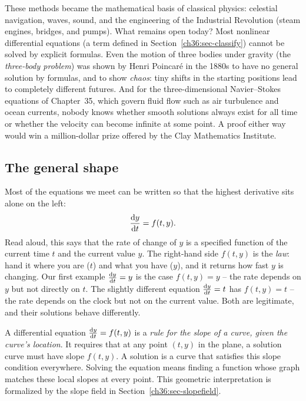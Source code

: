 \begin{historybox}
These methods became the mathematical basis of classical physics: celestial navigation, waves, sound, and the engineering of the Industrial Revolution (steam engines, bridges, and pumps). What remains open today? Most nonlinear differential equations (a term defined in Section~\ref{ch36:sec-classify}) cannot be solved by explicit formulas. Even the motion of three bodies under gravity (the \emph{three-body problem}) was shown by Henri Poincar\'e in the 1880s to have no general solution by formulas, and to show \emph{chaos}: tiny shifts in the starting positions lead to completely different futures. And for the three-dimensional Navier--Stokes equations of Chapter~35, which govern fluid flow such as air turbulence and ocean currents, nobody knows whether smooth solutions always exist for all time or whether the velocity can become infinite at some point. A proof either way would win a million-dollar prize offered by the Clay Mathematics Institute.
\end{historybox}

\subsection{The general shape}

Most of the equations we meet can be written so that the highest derivative sits alone on the left:
\[
  \frac{\mathrm{d} y}{\mathrm{d} t} = f(t, y).
\]
Read aloud, this says that the rate of change of $y$ is a specified function of the current time $t$ and the current value $y$. The right-hand side $f(t,y)$ is the \emph{law}: hand it where you are ($t$) and what you have ($y$), and it returns how fast $y$ is changing. Our first example $\frac{\mathrm{d} y}{\mathrm{d} t} = y$ is the case $f(t,y) = y$ -- the rate depends on $y$ but not directly on $t$. The slightly different equation $\frac{\mathrm{d} y}{\mathrm{d} t} = t$ has $f(t,y) = t$ -- the rate depends on the clock but not on the current value. Both are legitimate, and their solutions behave differently.

\begin{happeningbox}
A differential equation $\frac{\mathrm{d} y}{\mathrm{d} t} = f(t,y)$ is a \emph{rule for the slope of a curve, given the curve's location}. It requires that at any point $(t,y)$ in the plane, a solution curve must have slope $f(t,y)$. A solution is a curve that satisfies this slope condition everywhere. Solving the equation means finding a function whose graph matches these local slopes at every point. This geometric interpretation is formalized by the slope field in Section~\ref{ch36:sec-slopefield}.
\end{happeningbox}

